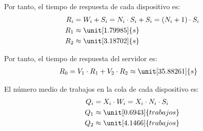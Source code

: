 \begin{ejercicio}
\begin{enumerate}
        Por tanto, el tiempo de respuesta de cada dispositivo es:
        \begin{align*}
            R_i &= W_i + S_i = N_i \cdot S_i + S_i = (N_i + 1) \cdot S_i\\
            R_1 &\approx \unit[1.79985]{s} \\
            R_2 &\approx \unit[3.18702]{s}
        \end{align*}

        Por tanto, el tiempo de respuesta del servidor es:
        \begin{align*}
            R_0 &= V_1 \cdot R_1 + V_2 \cdot R_2 \approx \unit[35.88261]{s}
        \end{align*}

        El número medio de trabajos en la cola de cada dispositivo es:
        \begin{align*}
            Q_i &= X_i \cdot W_i = X_i \cdot N_i \cdot S_i\\
            Q_1 &\approx \unit[0.6943]{trabajos} \\
            Q_2 &\approx \unit[4.1466]{trabajos}
        \end{align*}
    \end{enumerate}
\end{ejercicio}
\begin{comment}
\solucion
    \begin{enumerate}
        \item $V_{cpu} = 4$; $V_{disco} = 9$; $S_{cpu} = 0.8$ s; $S_{disco} = 0.53$ s; $X_{cpu} = 0.69$ trabajos/s; $X_{disco} = 1.56$ trabajos/s; $U_{cpu} = 0.56$; $U_{disco} = 0.83$.
        \item $X_0^{\max} = 0.21$ trabajos/s; $R_0^{\min} = 8.0$ s.
        \item $R_0 = 36$ s; $Q_{cpu} = 0.69$ trabajos; $Q_{disco} = 4.17$ trabajos.
    \end{enumerate}
\end{comment}

